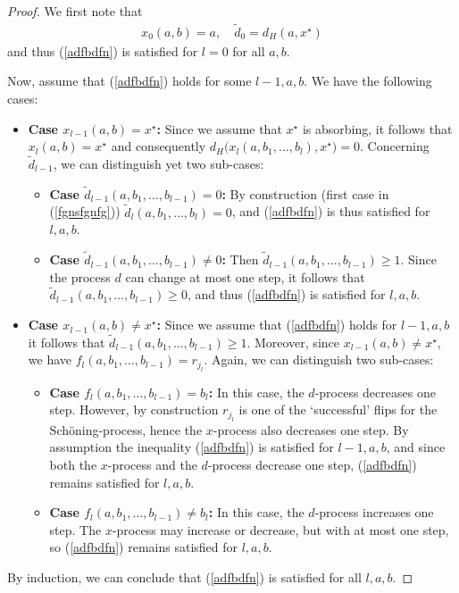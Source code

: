 \documentclass[a4paper,aps,floatfix]{revtex4}
\begin{document}
\begin{proof}
We first note that 
\begin{equation}
\begin{split}
x_0(a,b) = a,\quad \tilde{d}_0 = d_H(a,x^{\star})
\end{split}
\end{equation}
and thus (\ref{adfbdfn}) is satisfied for $l=0$ for all $a,b$.

Now, assume that (\ref{adfbdfn}) holds for some $l-1,a,b$.
We have the following cases:
\begin{itemize}
\item {\bf Case $x_{l-1}(a,b) = x^{\star}$:}  Since we assume that $x^{\star}$ is absorbing, it follows that $x_{l}(a,b) = x^{\star}$ and consequently $d_H\big(x_l(a,b_{1},\ldots,b_{l}),x^{\star}\big) = 0$.  Concerning $\tilde{d}_{l-1}$, we can distinguish yet two sub-cases:
\begin{itemize}
\item {\bf Case $\tilde{d}_{l-1}(a,b_1,\ldots,b_{l-1}) = 0$:} By construction (first case in (\ref{fgnsfgnfg})) $\tilde{d}_{l}(a,b_1,\ldots,b_{l}) = 0$, and (\ref{adfbdfn}) is thus satisfied for $l,a,b$.
\item {\bf Case $\tilde{d}_{l-1}(a,b_1,\ldots,b_{l-1}) \neq 0$:} Then $\tilde{d}_{l-1}(a,b_1,\ldots,b_{l-1}) \geq 1$. Since the process $d$ can change at most one step, it follows that $\tilde{d}_{l-1}(a,b_1,\ldots,b_{l-1}) \geq 0$, and thus (\ref{adfbdfn}) is satisfied for $l,a,b$.
\end{itemize}
\item {\bf  Case $x_{l-1}(a,b) \neq x^{\star}$:}
Since we assume that (\ref{adfbdfn}) holds for $l-1,a,b$ it follows that  $\tilde{d}_{l-1}(a,b_1,\ldots,b_{l-1}) \geq 1$. Moreover, since $x_{l-1}(a,b) \neq x^{\star}$, we have $f_l(a,b_1,\ldots,b_{l-1}) = r_{j_l}$. Again, we can distinguish two sub-cases:
\begin{itemize}
\item {\bf Case $f_l(a,b_{1},\ldots,b_{l-1}) = b_l$:} In this case, the $d$-process decreases one step. However, by construction $r_{j_l}$ is one of the `successful' flips for the Sch\"oning-process, hence the $x$-process also decreases one step.  By assumption the inequality  (\ref{adfbdfn}) is satisfied for  $l-1,a,b$, and since both the $x$-process and the $d$-process decrease one step, (\ref{adfbdfn}) remains satisfied for $l,a,b$.
\item {\bf Case $f_l(a,b_{1},\ldots,b_{l-1})\neq b_l$:}
In this case, the $d$-process increases one step. The $x$-process may increase or decrease, but with at most one step, so (\ref{adfbdfn}) remains satisfied for $l,a,b$.
\end{itemize}
\end{itemize}
By induction, we can conclude that (\ref{adfbdfn}) is satisfied for all $l,a,b$.
\end{proof}
\end{document}
